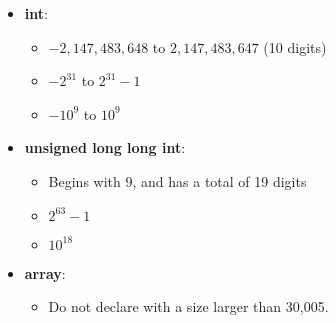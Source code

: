 \begin{itemize}
    \item \textbf{int}:
    \begin{itemize}
        \item $-2,147,483,648$ to $2,147,483,647$ (10 digits)
        \item $-2^{31}$ to $2^{31} - 1$
        \item $-10^9$ to $10^9$
    \end{itemize}

    \item \textbf{unsigned long long int}:
    \begin{itemize}
        \item Begins with 9, and has a total of 19 digits
        \item $2^{63} -1$
        \item $10^{18}$
    \end{itemize}

    \item \textbf{array}:
    \begin{itemize}
        \item Do not declare with a size larger than 30,005.
    \end{itemize}
\end{itemize}




